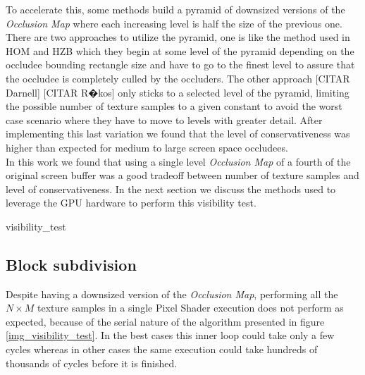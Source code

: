 \documentclass[10pt, conference]{IEEEtran}
\begin{document}
To accelerate this, some methods build a pyramid of downsized versions of the \emph{Occlusion Map} where each increasing level is half the size of the previous one. 
There are two approaches to utilize the pyramid, one is like the method used in HOM \cite{hom} and HZB \cite{Hierarchical_zbuffer} which they begin at 
some level of the pyramid depending on the occludee bounding rectangle size and have to go to the finest level to assure that the occludee is completely 
culled by the occluders.
The other approach [CITAR Darnell] [CITAR R�kos] only sticks to a selected level of the pyramid, limiting the possible number of texture samples to a given 
constant to avoid the worst case scenario where they have to move to levels with greater detail. 
After implementing this last variation we found that the level of conservativeness was higher than expected for medium to large screen space occludees.\\

In this work we found that using a single level \emph{Occlusion Map} of a fourth of the original screen buffer was a good tradeoff between number of texture samples 
and level of conservativeness. In the next section we discuss the methods used to leverage the GPU hardware to perform this visibility test.


{visibility_test}{
%
}



\subsection{Block subdivision}
%
Despite having a downsized version of the \emph{Occlusion Map}, performing all the $N \times M$ texture samples in a single Pixel Shader execution 
does not perform as expected, because of the serial nature of the algorithm presented in figure \ref{img_visibility_test}. 
In the best cases this inner loop could take only a few cycles whereas in other cases the same execution could take hundreds of thousands of cycles before it is finished.\\
\end{document}

